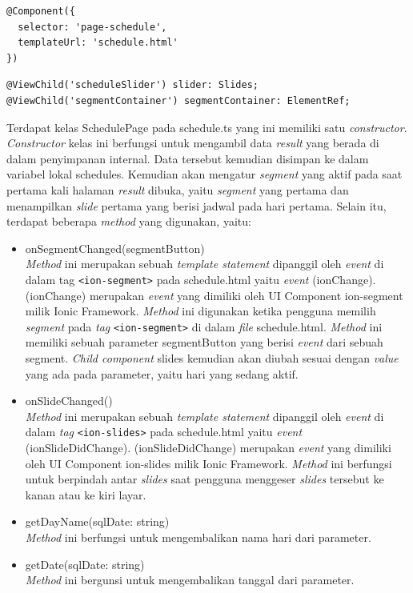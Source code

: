 \begin{enumerate}
\begin{lstlisting}[label={lst:componentschedule}, caption=@Component pada schedule.ts]
@Component({
  selector: 'page-schedule',
  templateUrl: 'schedule.html'
})
\end{lstlisting}

\begin{lstlisting}[label={lst:viewchildtresult}, caption=@ViewChild pada schedule.ts]
@ViewChild('scheduleSlider') slider: Slides;
@ViewChild('segmentContainer') segmentContainer: ElementRef;
\end{lstlisting} 
\newpage
	Terdapat kelas SchedulePage pada schedule.ts yang ini memiliki satu \textit{constructor}. \textit{Constructor} kelas ini berfungsi untuk mengambil data \textit{result} yang berada di dalam penyimpanan internal. Data tersebut kemudian disimpan ke dalam variabel lokal schedules. Kemudian akan mengatur \textit{segment} yang aktif pada saat pertama kali halaman \textit{result} dibuka, yaitu \textit{segment} yang pertama dan menampilkan \textit{slide} pertama yang berisi jadwal pada hari pertama. Selain itu, terdapat beberapa \textit{method} yang digunakan, yaitu:
	
	\begin{itemize}
		\item onSegmentChanged(segmentButton) \\
		\textit{Method} ini merupakan sebuah \textit{template statement} dipanggil oleh \textit{event} di dalam tag \texttt{<ion-segment>} pada schedule.html yaitu \textit{event} (ionChange). (ionChange) merupakan \textit{event} yang dimiliki oleh UI Component ion-segment milik Ionic Framework. \textit{Method} ini digunakan ketika pengguna memilih \textit{segment} pada \textit{tag} \texttt{<ion-segment>} di dalam \textit{file} schedule.html. \textit{Method} ini memiliki sebuah parameter segmentButton yang berisi \textit{event} dari sebuah segment. \textit{Child component} slides kemudian akan diubah sesuai dengan \textit{value} yang ada pada parameter, yaitu hari yang sedang aktif. 
		
		\item onSlideChanged() \\
		\textit{Method} ini merupakan sebuah \textit{template statement} dipanggil oleh \textit{event} di dalam \textit{tag} \texttt{<ion-slides>} pada schedule.html yaitu \textit{event} (ionSlideDidChange). (ionSlideDidChange) merupakan \textit{event} yang dimiliki oleh UI Component ion-slides milik Ionic Framework. \textit{Method} ini berfungsi untuk berpindah antar \textit{slides} saat pengguna menggeser \textit{slides} tersebut ke kanan atau ke kiri layar.
		\item getDayName(sqlDate: string) \\
		\textit{Method} ini berfungsi untuk mengembalikan nama hari dari parameter.
		\item getDate(sqlDate: string) \\
		\textit{Method} ini bergunsi untuk mengembalikan tanggal dari parameter.
	\end{itemize}
	

\end{enumerate}
